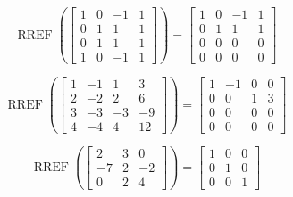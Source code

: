 \documentclass{article}
\DeclareMathOperator{\RREF}{RREF}
\begin{document}
\[
  \RREF\left(\begin{bmatrix}
    1 & 0 & -1 & 1 \\
    0 & 1 & 1 & 1 \\
    0 & 1 & 1 & 1 \\
    1 & 0 & -1 & 1
  \end{bmatrix} \right) =
  \begin{bmatrix}
    1 & 0 & -1 & 1 \\
    0 & 1 & 1 & 1 \\
    0 & 0 & 0 & 0 \\
    0 & 0 & 0 & 0 
  \end{bmatrix}
\]







\[\RREF\left( 
\begin{bmatrix} 
 1 & -1 & 1 & 3 \\
 2 & -2 & 2 & 6\\
 3 & -3 & -3 & -9\\
 4 & -4 & 4 & 12
\end{bmatrix} \right)
 =
  \begin{bmatrix}
    1 & -1 & 0 & 0 \\
    0 & 0 & 1 & 3 \\
    0 & 0 & 0 & 0 \\
    0 & 0 & 0 & 0 
  \end{bmatrix}
\]



\[\RREF \left(  \begin{bmatrix}
2 & 3 & 0 \\
-7 & 2 & -2 \\ 
0 & 2 & 4
\end{bmatrix}  \right) = \begin{bmatrix} 
1 & 0 & 0 \\ 
0 & 1 &0 \\ 
0 & 0 & 1 \end{bmatrix}\]

\end{document}
